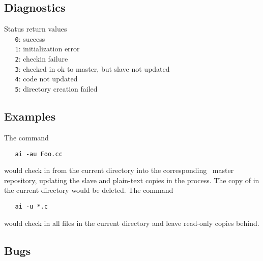 \subsection*{Diagnostics}

Status return values
\\ \verb+   0+: success
\\ \verb+   1+: initialization error
\\ \verb+   2+: checkin failure
\\ \verb+   3+: checked in ok to master, but slave not updated
\\ \verb+   4+: code not updated
\\ \verb+   5+: directory creation failed

\subsection*{Examples}

The command

\begin{verbatim}
   ai -au Foo.cc
\end{verbatim}

\noindent
would check in  from the current directory into the corresponding
\aipspp\ master repository, updating the slave and plain-text copies in the
process.  The copy of  in the current directory would be deleted.
The command

\begin{verbatim}
   ai -u *.c
\end{verbatim}

\noindent
would check in all  files in the current directory and leave
read-only copies behind.

\subsection*{Bugs}

